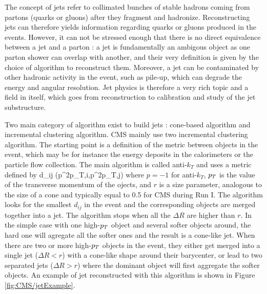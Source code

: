         The concept of jets refer to collimated bunches of stable hadrons coming from partons
        (quarks or gluons) after they fragment and hadronize. Reconstructing jets can
        therefore yields information regarding quarks or gluons produced in the events.
        However, it can not be stressed enough that there is no direct equivalence between
        a jet and a parton : a jet is fundamentally an ambigous object as one parton
        shower can overlap with another, and their very definition is given by the choice
        of algorithm to reconstruct them. Moreover, a jet can be contaminated by other
        hadronic activity in the event, such as pile-up, which can degrade the energy
        and angular resolution. Jet physics is therefore a very rich topic and a field
        in itself, which goes from reconstruction to calibration and study of the jet
        substructure.

        Two main category of algorithm exist to build jets : cone-based algorithm and
        incremental clustering algorithm. CMS mainly use two incremental clustering
        algorithm. The starting point is a definition of the metric between objects in the
        event, which may be for instance the energy deposits in the calorimeters or the
        particle flow collection. The main algorithm is called anti-$k_T$ and uses a metric
        defined by
        {
            d_{ij}  {}(p^{2p}_{T,i},p^{2p}_{T,j}) 
        }
        where $p = -1$ for anti-$k_T$, $p_T$ is the value of the transverse momentum of
        the ojects, and $r$ is a size parameter, analogous to the size of a cone and
        typically equal to 0.5 for CMS during Run I. The algorithm looks for the smallest
        $d_{ij}$ in the event and the corresponding objects are merged together into a
        jet. The algorithm stops when all the $\Delta R$ are higher than $r$. In the
        simple case with one high-$p_T$ object and several softer objects around, the
        hard one will agregate all the softer ones and the result is a cone-like jet. When
        there are two or more high-$p_T$ objects in the event, they either get merged into
        a single jet ($\Delta R < r$) with a cone-like shape around their barycenter, or
        lead to two separated jets ($\Delta R > r$) where the dominant object will first
        aggregate the softer objects. An example of jet reconstructed with this algorithm
        is shown in Figure \ref{fig:CMS/jetExample}.

